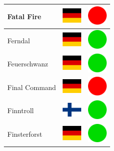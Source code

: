 \documentclass[12pt, a4paper, twoside]{report}
\begin{document}
\begin{center}
\begin{longtable}{|p{5cm}|p{2cm}|p{2cm}|}
 Fatal Fire                                                 & \includegraphics[width=1cm]{../img/flags/de} &   \includegraphics[width=1cm]{../likes/n} \\ \hline
 Ferndal                                                    & \includegraphics[width=1cm]{../img/flags/de} &   \includegraphics[width=1cm]{../likes/y} \\ \hline
 Feuerschwanz                                               & \includegraphics[width=1cm]{../img/flags/de} &   \includegraphics[width=1cm]{../likes/y} \\ \hline
 Final Command                                              & \includegraphics[width=1cm]{../img/flags/de} &   \includegraphics[width=1cm]{../likes/n} \\ \hline
 Finntroll                                                  & \includegraphics[width=1cm]{../img/flags/fi} &   \includegraphics[width=1cm]{../likes/y} \\ \hline
 Finsterforst                                               & \includegraphics[width=1cm]{../img/flags/de} &   \includegraphics[width=1cm]{../likes/y} \\ \hline

\end{longtable}
\end{center}
\end{document}
